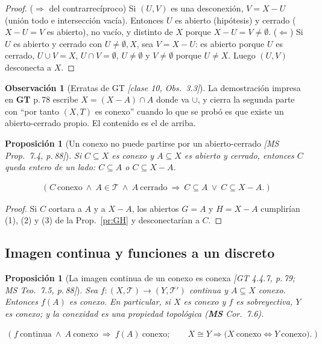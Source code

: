\documentclass[11pt,a4paper]{article}
\newcommand{\lgc}[1]{\par\vspace{-3pt}\begin{gather*}\big(\;#1\;\big)\end{gather*}\vspace{-6pt}}
\theoremstyle{definition}
\newtheorem{observacion}[definicion]{Observación}
\theoremstyle{plain}
\newtheorem{proposicion}[definicion]{Proposición}
\newcommand{\fnt}[1]{{\normalfont\small\itshape\color{gray!150!black}[#1]}}
\newcommand{\tp}{\mathcal{T}}
\begin{document}
\begin{proof}
($\Rightarrow$ del contrarrecíproco) Si $(U,V)$ es una desconexión, $V=X-U$ (unión todo e intersección vacía). Entonces $U$ es abierto (hipótesis) y cerrado ($X-U=V$ es abierto), no vacío, y distinto de $X$ porque $X-U=V\ne\emptyset$.
($\Leftarrow$) Si $U$ es abierto y cerrado con $U\ne\emptyset,X$, sea $V=X-U$: es abierto porque $U$ es cerrado, $U\cup V=X$, $U\cap V=\emptyset$, $U\ne\emptyset$ y $V\ne\emptyset$ porque $U\ne X$. Luego $(U,V)$ desconecta a $X$.
\end{proof}

\begin{observacion}[Erratas de GT \fnt{clase 10, Obs.\ 3.3}]
La demostración impresa en \textbf{GT} p.\,78 escribe $X=(X-A)\cap A$ donde va $\cup$, y cierra la segunda parte con ``por tanto $(X,T)$ es conexo'' cuando lo que se probó es que existe un abierto-cerrado propio. El contenido es el de arriba.
\end{observacion}

\begin{proposicion}[Un conexo no puede partirse por un abierto-cerrado \fnt{MS Prop.\ 7.4, p.\,88}]\label{pr:conexlado}
Si $C\subseteq X$ es conexo y $A\subseteq X$ es abierto y cerrado, entonces $C$ queda entero de un lado: $C\subseteq A$ o $C\subseteq X-A$.
\lgc{C\ \text{conexo}\ \wedge\ A\in\tp\ \wedge\ A\ \text{cerrado}\ \Rightarrow\ C\subseteq A\ \vee\ C\subseteq X-A.}
\end{proposicion}

\begin{proof}
Si $C$ cortara a $A$ y a $X-A$, los abiertos $G=A$ y $H=X-A$ cumplirían (1), (2) y (3) de la Prop.~\ref{pr:GH} y desconectarían a $C$.
\end{proof}

\subsection{Imagen continua y funciones a un discreto}

\begin{proposicion}[La imagen continua de un conexo es conexa \fnt{GT 4.4.7, p.\,79; MS Teo.\ 7.5, p.\,88}]\label{pr:imconex}
Sea $f:(X,\tp)\to(Y,\tp')$ continua y $A\subseteq X$ conexo. Entonces $f(A)$ es conexo. En particular, si $X$ es conexo y $f$ es sobreyectiva, $Y$ es conexo; y la conexidad es una propiedad topológica (\textbf{MS} Cor.\ 7.6).
\lgc{f\ \text{continua}\ \wedge\ A\ \text{conexo}\ \Rightarrow\ f(A)\ \text{conexo};\qquad X\cong Y\Rightarrow\big(X\ \text{conexo}\iff Y\ \text{conexo}\big).}
\end{proposicion}
\end{document}
